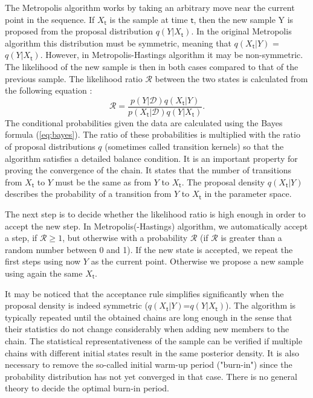 \documentclass{wihuri}
\def\be{\begin{equation}}
\def\ee{\end{equation}}
\def\tstep{\mathsf{t}}
\def\lratio{\mathcal{R}}
\begin{document}
The Metropolis algorithm works by taking an arbitrary move near the current
point in the sequence. If $X_{\tstep}$ is the sample at time $\tstep$, then the new sample Y is proposed from the proposal distribution $q(Y|X_{\tstep})$. In the original Metropolis algorithm this distribution must be symmetric, meaning that $q(X_{\tstep}|Y)$ = $q(Y|X_{\tstep})$. However, in Metropolis-Hastings algorithm it may be non-symmetric. The likelihood of the new sample is then in both cases compared to that of the previous sample. The likelihood ratio $\lratio$ between the two states is calculated from the following equation \cite{tuomi}:
\be \label{eq:likely_ratio} 
\lratio= \frac{p(Y|\mathcal{D})q(X_{\tstep}|Y)}{p(X_{\tstep}|\mathcal{D})q(Y|X_{\tstep})}.
\ee
The conditional probabilities given the data are calculated using the Bayes formula (\ref{eq:bayes}). The ratio of these probabilities is multiplied with the ratio of proposal distributions $q$ (sometimes called transition kernels) so that the algorithm satisfies a detailed balance condition. It is an important property for proving the convergence of the chain. It states that the number of transitions from $X_{\tstep}$ to $Y$ must be the same as from $Y$ to $X_{\tstep}$.  The proposal density $q(X_{\tstep}|Y)$ describes the probability of a transition from $Y$ to $X_{\tstep}$ in the parameter space.

The next step is to decide whether the likelihood ratio is high enough in order to accept the new step. In Metropolis(-Hastings) algorithm, we automatically accept a step, if $\lratio \ge 1$, but otherwise with a probability $\lratio$ (if $\lratio$ is greater than a random number between 0 and 1). If the new state is accepted, we repeat the first steps using now $Y$ as the current point. Otherwise we propose a new sample using again the same $X_{\tstep}$. 



It may be noticed that the acceptance rule simplifies significantly when the
proposal density is indeed symmetric ($q(X_{\tstep}|Y)$=$q(Y|X_{\tstep})$). The algorithm is typically repeated until the obtained chains are long enough in the sense that their statistics do not change considerably when adding new members to the chain. The statistical representativeness of the sample can be verified
if multiple chains with different initial states result in the same posterior density. It is also necessary to remove the so-called initial warm-up period ("burn-in") %
since the probability distribution has not yet converged in that case. %
There is no general theory to decide the optimal burn-in period.%
\end{document}
